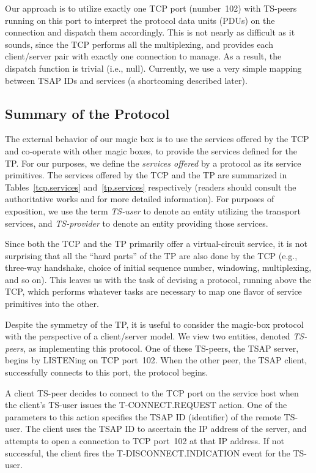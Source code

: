 Our approach is to utilize exactly one TCP port (number~102) with
TS-peers running on this port to interpret the protocol data units (PDUs)
on the connection and dispatch them accordingly.
This is not nearly as difficult as it sounds,
since the TCP performs all the multiplexing,
and provides each client/server pair with exactly one connection to manage.
As a result, the dispatch function is trivial (i.e., null).
Currently,
we use a very simple mapping between TSAP IDs and services
(a shortcoming described later).

\subsection	{Summary of the Protocol}\label{protocol}
The external behavior of our magic box is to use the services offered by the
TCP
and co-operate with other magic boxes,
to provide the services defined for the TP.
For our purposes,
we define the {\em services offered\/} by a protocol
as its service primitives.
The services offered by the TCP and the TP are summarized in
Tables~\ref{tcp.services} and~\ref{tp.services} respectively
(readers should consult the authoritative works \cite{TCP} and
\cite{ISO.TP.Service} for more detailed information).
For purposes of exposition,
we use the term {\em TS-user\/} to denote an entity utilizing the transport
services,
and {\em TS-provider\/} to denote an entity providing those services.

Since both the TCP and the TP primarily offer a virtual-circuit service,
it is not surprising that
all the ``hard parts'' of the TP are also done by the TCP
(e.g., three-way handshake, choice of initial sequence number, windowing,
multiplexing, and so on).
This leaves us with the task of devising a protocol,
running above the TCP,
which performs whatever tasks are necessary to map one flavor of service
primitives into the other.

Despite the symmetry of the TP,
it is useful to consider the magic-box protocol with the perspective of a
client/server model.
We view two entities, denoted {\em TS-peers}, as implementing this protocol.
One of these TS-peers,
the TSAP server, begins by LISTENing on TCP port~102.
When the other peer, the TSAP client, successfully connects to this port,
the protocol begins.

A client TS-peer decides to connect to the TCP port on the service host
when the client's TS-user issues the {\sf T-CONNECT.REQUEST\/} action.
One of the parameters to this action specifies the TSAP ID (identifier) of
the remote TS-user.
The client uses the TSAP ID to ascertain the IP address of the server,
and attempts to open a connection to TCP port~102 at that IP address.
If not successful,
the client fires the {\sf T-DISCONNECT.INDICATION\/} event for the TS-user.

